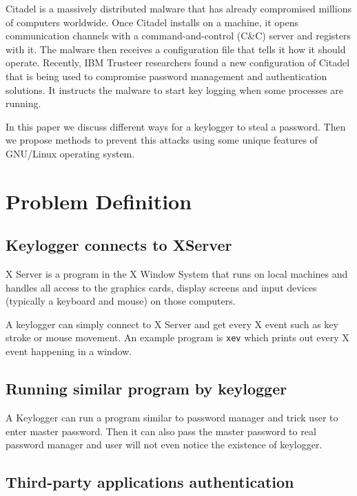 \documentclass[journal]{IEEEtran}
\begin{document}
Citadel is a massively distributed malware that has already compromised millions of computers worldwide. Once Citadel installs on a machine, it opens communication channels with a command-and-control (C\&C) server and registers with it. The malware then receives a configuration file that tells it how it should operate. Recently, IBM Trusteer researchers found a new configuration of Citadel that is being used to compromise password management and authentication solutions. It instructs the malware to start key logging when some processes are running. \cite{securityintelligence:citadel}

In this paper we discuss different ways for a keylogger to steal a password. Then we propose methods to prevent this attacks using some unique features of GNU/Linux operating system.

\section{Problem Definition}
\label{problems}

\subsection{Keylogger connects to XServer}

X Server is a program in the X Window System that runs on local machines and handles all access to the graphics cards, display screens and input devices (typically a keyboard and mouse) on those computers. \cite{linfo:xserver} 

A keylogger can simply connect to X Server and get every X event such as key stroke or mouse movement. An example program is \texttt{xev} which prints out every X event happening in a window.

\subsection{Running similar program by keylogger}

A Keylogger can run a program similar to password manager and trick user to enter master password. Then it can also pass the master password to real password manager and user will not even notice the existence of keylogger.

\subsection{Third-party applications authentication}
\end{document}
